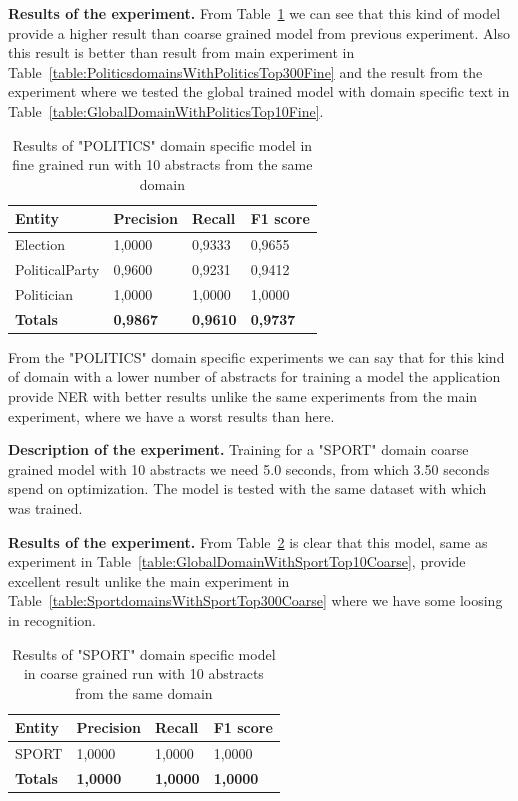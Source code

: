 \documentclass[thesis=M,english]{FITthesis}[2018/05/30]
\begin{document}
	\textbf{Results of the experiment.} From Table~\ref{table:PoliticsDomainWithPoliticsTop10Fine} we can see that this kind of model provide a higher result than coarse grained model from previous experiment. Also this result is better than result from main experiment in Table~\ref{table:PoliticsdomainsWithPoliticsTop300Fine} and the result from the experiment where we tested the global trained model with domain specific text in Table~\ref{table:GlobalDomainWithPoliticsTop10Fine}.
	
	\begin{table}[H]\centering
		\begin{tabular}{|l|l|l|l|}
			\hline {\textbf{Entity}} & {\textbf{Precision}} & {\textbf{Recall}} & {\textbf{F1 score}}\\\hline
				Election & 1,0000 & 0,9333 & 0,9655\\
				PoliticalParty & 0,9600 & 0,9231 & 0,9412\\
				Politician & 1,0000 & 1,0000 & 1,0000\\\hline
				\textbf{Totals} & \textbf{0,9867} & \textbf{0,9610} & \textbf{0,9737}\\\hline
		\end{tabular}
		\caption{Results of "POLITICS" domain specific model in fine grained run with 10 abstracts from the same domain \label{table:PoliticsDomainWithPoliticsTop10Fine}}		
	\end{table}	

	From the "POLITICS" domain specific experiments we can say that for this kind of domain with a lower number of abstracts for training a model the application provide NER with better results unlike the same experiments from the main experiment, where we have a worst results than here.
		
	
	\textbf{Description of the experiment.} Training for a "SPORT" domain coarse grained model with 10 abstracts we need 5.0 seconds, from which 3.50 seconds spend on optimization. The model is tested with the same dataset with which was trained.
	
	\textbf{Results of the experiment.} From Table~\ref{table:SportDomainWithSportTop10Coarse} is clear that this model, same as experiment in Table~\ref{table:GlobalDomainWithSportTop10Coarse}, provide excellent result unlike the main experiment in Table~\ref{table:SportdomainsWithSportTop300Coarse} where we have some loosing in recognition. 
	
	\begin{table}[H]\centering
		\begin{tabular}{|l|l|l|l|}
			\hline {\textbf{Entity}} & {\textbf{Precision}} & {\textbf{Recall}} & {\textbf{F1 score}}\\\hline
				SPORT & 1,0000 & 1,0000 & 1,0000\\\hline
				\textbf{Totals} & \textbf{1,0000} & \textbf{1,0000} & \textbf{1,0000}\\\hline
		\end{tabular}
		\caption{Results of "SPORT" domain specific model in coarse grained run with 10 abstracts from the same domain \label{table:SportDomainWithSportTop10Coarse}}
	\end{table}	
\end{document}

